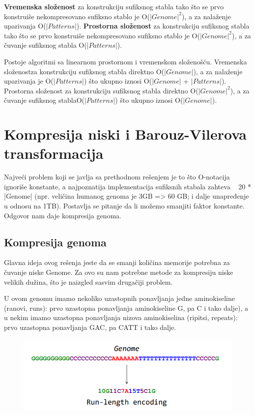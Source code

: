 \noindent\textbf{Vremenska složenost} za konstrukciju sufiksnog stabla tako što se prvo konstruiše nekompresovano sufiksno stablo je O($|Genome|^2$), a za nalaženje uparivanja O($|Patterns|$). \textbf{Prostorna složenost}  za konstrukciju sufiksnog stabla tako što se prvo konstruiše nekompresovano sufiksno stablo je O($|Genome|^2$), a  za čuvanje sufiksnog stabla O($|Patterns|$).

Postoje algoritmi sa linearnom prostornom i vremenskom složenošću. Vremenska složenostza konstrukciju sufiksnog stabla direktno  O($|Genome|$), a za nalaženje uparivanja je O($|Patterns|$) što ukupno iznosi O($|Genome|$ + $|Patterns|$). Prostorna složenost za konstrukciju sufiksnog stabla direktno O($|Genome|^2$), a za čuvanje sufiksnog stablaO($|Patterns|$) što ukupno iznosi O($|Genome|$).

\section{Kompresija niski i Barouz-Vilerova transformacija}

Najveći problem koji se javlja sa prethodnom rešenjem je to što O-notacija ignoriše konstante, a najpoznatija implementacija sufiksnih stabala zahteva ~ 20 * |Genome| (npr. veličina humanog genoma je 3GB => 60 GB; i dalje unapređenje u odnosu na 1TB). Postavlja se pitanje da li možemo smanjiti faktor konstante. Odgovor nam daje kompresija genoma.

\subsection{Kompresija genoma}

Glavna ideja ovog rešenja jeste da se smanji količina memorije potrebna za čuvanje niske Genome. Za ovo su nam potrebne metode za kompresiju niske velikih dužina, što je naizgled sasvim drugačiji problem.

U ovom genomu imamo nekoliko uzastopnih ponavljanja jedne aminokiseline (ranovi, runs): prvo uzastopna ponavljanja aminokiseline G, pa C i tako dalje), a u nekim imamo uzastopna ponavljanja nizova aminokiselina (ripitsi, repeats): prvo uzastopna ponavljanja GAC, pa CATT i tako dalje.

\begin{figure}[H]
	\centering
	\includegraphics[scale=0.5]{poglavlja/9/slike/kompresijaGenoma.png}
	\caption{}
	\label{slika:X}
\end{figure}

